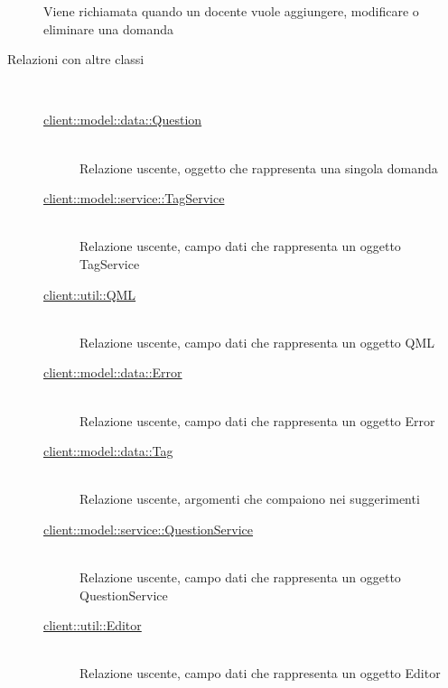 \begin{description}
Viene richiamata quando un docente vuole aggiungere,  modificare o eliminare una domanda
\item[Relazioni con altre classi] \hfill \\
\vspace{-7mm}
\begin{description}
	\item[\hyperlink{client::model::data::Question}{client::model::data::Question}] \hfill \\
	Relazione uscente, oggetto che rappresenta una singola domanda
	\item[\hyperlink{client::model::service::TagService}{client::model::service::TagService}] \hfill \\
	Relazione uscente, campo dati che rappresenta un oggetto TagService
	\item[\hyperlink{client::util::QML}{client::util::QML}] \hfill \\
	Relazione uscente, campo dati che rappresenta un oggetto QML
	\item[\hyperlink{client::model::data::Error}{client::model::data::Error}] \hfill \\
	Relazione uscente, campo dati che rappresenta un oggetto Error
	\item[\hyperlink{client::model::data::Tag}{client::model::data::Tag}] \hfill \\
	Relazione uscente, argomenti che compaiono nei suggerimenti
	\item[\hyperlink{client::model::service::QuestionService}{client::model::service::QuestionService}] \hfill \\
	Relazione uscente, campo dati che rappresenta un oggetto QuestionService
	\item[\hyperlink{client::util::Editor}{client::util::Editor}] \hfill \\
	Relazione uscente, campo dati che rappresenta un oggetto Editor
\end{description}


\end{description}
